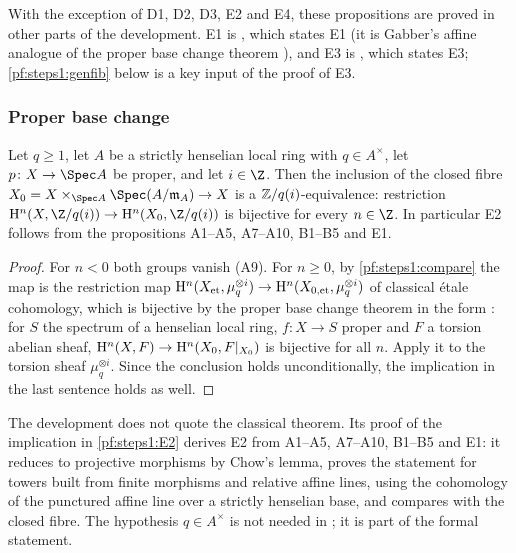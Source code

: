With the exception of D1, D2, D3, E2 and E4, these propositions are proved in other parts of the
development. E1 is , which states E1 (it is Gabber's
affine analogue of the proper base change theorem \cite{Gabber1994}), and E3 is
, which states E3; \cref{pf:steps1:genfib} below is a
key input of the proof of E3.

\subsubsection{Proper base change}

\begin{theorem}\label{pf:steps1:E2}
Let $q\ge1$, let $A$ be a strictly henselian local ring with $q\in A^\times$, let $p\colon X\to\Spec A$ be
proper, and let $i\in\Z$. Then the inclusion of the closed fibre $X_0=X\times_{\Spec A}\Spec(A/\mathfrak m_A)\to X$
is a $\mathbb{Z}/q(i)$-equivalence: restriction $\stepsIH^n(X,\Z/q(i))\to\stepsIH^n(X_0,\Z/q(i))$ is bijective for
every $n\in\Z$. In particular E2 follows from the propositions A1--A5, A7--A10, B1--B5 and E1.
\end{theorem}

\begin{proof}
For $n<0$ both groups vanish (A9). For $n\ge0$, by \cref{pf:steps1:compare} the map is the restriction map
$\mathrm{H}^n(X_{\mathrm{et}},\mu_q^{\otimes i})\to\mathrm{H}^n(X_{0,\mathrm{et}},\mu_q^{\otimes i})$ of classical \'etale
cohomology, which is bijective by the proper base change theorem in the form
\cite[Exp.~XII, Cor.~5.5(iii)]{ArtinGrothendieckVerdier1972}: for $S$ the spectrum of a henselian local ring,
$f\colon X\to S$ proper and $F$ a torsion abelian sheaf, $\mathrm{H}^n(X,F)\to\mathrm{H}^n(X_0,F|_{X_0})$ is bijective for
all $n$. Apply it to the torsion sheaf $\mu_q^{\otimes i}$. Since the conclusion holds unconditionally, the implication
in the last sentence holds as well.
\end{proof}

\begin{remark}\label{pf:steps1:E2rem}
The development does not quote the classical theorem. Its proof of the implication in \cref{pf:steps1:E2} derives E2
from A1--A5, A7--A10, B1--B5 and E1: it reduces to projective morphisms by Chow's lemma, proves the statement for
towers built from finite morphisms and relative affine lines, using the cohomology of the punctured affine line over
a strictly henselian base, and compares with the closed fibre. The hypothesis $q\in A^\times$ is not needed in
\cite[Exp.~XII]{ArtinGrothendieckVerdier1972}; it is part of the formal statement.
\end{remark}


